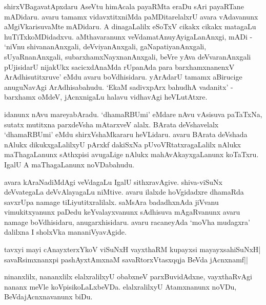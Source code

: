shirxVBagavatApxdaru AseVtu himAcala payaRMta eraDu sAri payaRTane mADidaru. avaru tamamx vidavxtitxniMda paMDitarelalxrU avara vAdavanunx aMgiVkarisuvaMte mADidaru. A dinagaLalilx eSoTxV cikakx cikakx matagaLu huTiTxkoMDidadxvu. aMthavaranunx veVdamatAnuyAyigaLanAnxgi, mADi - `niVnu shivananAnxgali, deVviyanAnxgali, gaNapatiyanAnxgali, sUyaRnanAnxgali, subarxhamxNayxnanAnxgali, beVre yAva deVvaranAnxgali pUjisidarU nijakUkx sacicxdAnaMda rUpanAda para barxhamxnanenxV ArAdhisutitxruve' eMdu avaru boVdhisidaru. yArAdarU tamamx aBirucige anuguNavAgi ArAdhisabahudu. `EkaM sadivxpArx bahudhA vadanitx' - barxhamx oMdeV, jAcnxnigaLu halavu vidhavAgi heVLutAtxre.

idanunx nAvu mareyabAradu. `dhamaRBUmi' eMdare nAvu vAsisuva paTaTx‌Na, sutatx mutitxna parxdeVsha mAtarxveV alalx. BArata deVshavelalx `dhamaRBUmi' eMdu shirxVshaMkararu heVLidaru. avaru BArata deVshada nAlukx dikukxgaLalilxyU pArxkf dakiSxNa pUvoVRtatxragaLalilx nAlukx maThagaLanunx sAthxpisi avugaLige nAlukx mahAvAkayxgaLanunx koTaTxru. IgalU A maThagaLanunx noVDabahudu.

avara kAraNadiMdAgi veVdagaLu IgalU sithxravAgive. shiva-viSuNx deVvategaLa deVvAlayagaLu niMtive. avaru ilalxde hoVgidadxre dhamaRda savxrUpa namage tiLiyutitxralilalx. saMsAra badadhxnAda jiVvanu vimukitxyanunx paDedu keYvalayxvanunx sAdhisuva mAgaRvanunx avaru namage boVdhisidaru, anugarxhisidaru. avaru racaneyAda `moVha mudagxra' dalilxna I sholxVka mananiVyavAgide.

\begin{shloka}
tavxyi mayi cAnayxterxYkoV viSuNxH vayxthaRM kupayxsi mayayxsahiSuNxH|\\
savaRsimxnanxpi pashAyxtAmxnaM savaRtorxVtasxqqja BeVda jAcnxnamf||
\end{shloka}

ninanxlilx, nananxlilx elalxralilxyU obabxneV parxBuvidAdxne, vayxthaRvAgi nananx meVle koVpisikoLaLxbeVDa. elalxralilxyU Atamxnanunx noVDu, BeVdajAcnxnavanunx biDu.



\endchapter
